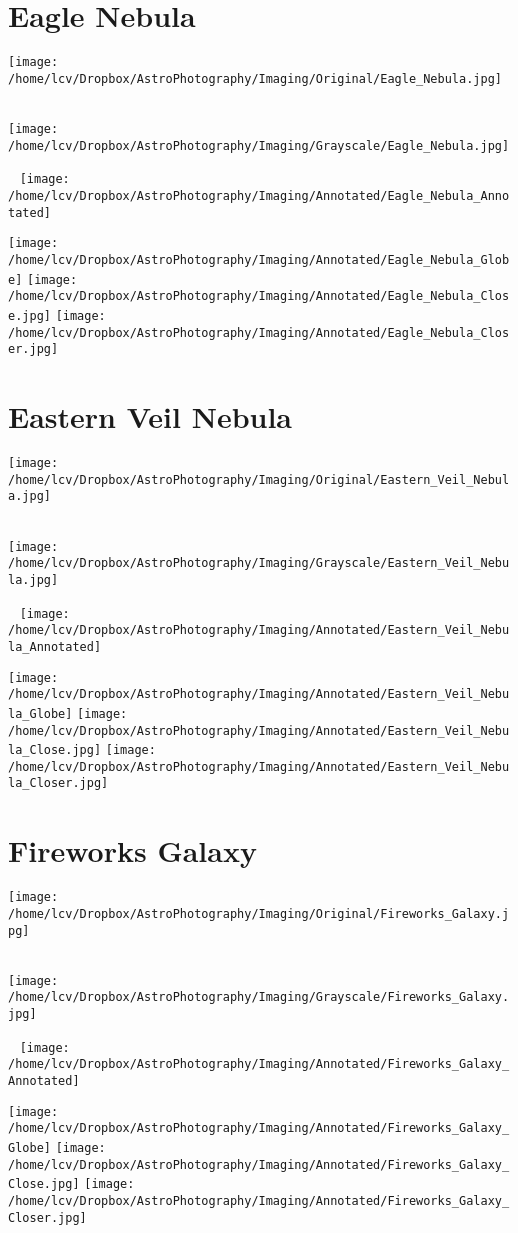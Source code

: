 \section{Eagle Nebula}
\texttt{[image: /home/lcv/Dropbox/AstroPhotography/Imaging/Original/Eagle\_Nebula.jpg]}
{\footnotesize\color{white}

}\ \\
\texttt{[image: /home/lcv/Dropbox/AstroPhotography/Imaging/Grayscale/Eagle\_Nebula.jpg]}
\begin{center}
 \ \newpage
\texttt{[image: /home/lcv/Dropbox/AstroPhotography/Imaging/Annotated/Eagle\_Nebula\_Annotated]}

\texttt{[image: /home/lcv/Dropbox/AstroPhotography/Imaging/Annotated/Eagle\_Nebula\_Globe]}
\texttt{[image: /home/lcv/Dropbox/AstroPhotography/Imaging/Annotated/Eagle\_Nebula\_Close.jpg]}
\texttt{[image: /home/lcv/Dropbox/AstroPhotography/Imaging/Annotated/Eagle\_Nebula\_Closer.jpg]}
\end{center}
\section{Eastern Veil Nebula}
\texttt{[image: /home/lcv/Dropbox/AstroPhotography/Imaging/Original/Eastern\_Veil\_Nebula.jpg]}
{\footnotesize\color{white}

}\ \\
\texttt{[image: /home/lcv/Dropbox/AstroPhotography/Imaging/Grayscale/Eastern\_Veil\_Nebula.jpg]}
\begin{center}
 \ \newpage
\texttt{[image: /home/lcv/Dropbox/AstroPhotography/Imaging/Annotated/Eastern\_Veil\_Nebula\_Annotated]}

\texttt{[image: /home/lcv/Dropbox/AstroPhotography/Imaging/Annotated/Eastern\_Veil\_Nebula\_Globe]}
\texttt{[image: /home/lcv/Dropbox/AstroPhotography/Imaging/Annotated/Eastern\_Veil\_Nebula\_Close.jpg]}
\texttt{[image: /home/lcv/Dropbox/AstroPhotography/Imaging/Annotated/Eastern\_Veil\_Nebula\_Closer.jpg]}
\end{center}
\section{Fireworks Galaxy}
\texttt{[image: /home/lcv/Dropbox/AstroPhotography/Imaging/Original/Fireworks\_Galaxy.jpg]}
{\footnotesize\color{white}

}\ \\
\texttt{[image: /home/lcv/Dropbox/AstroPhotography/Imaging/Grayscale/Fireworks\_Galaxy.jpg]}
\begin{center}
 \ \newpage
\texttt{[image: /home/lcv/Dropbox/AstroPhotography/Imaging/Annotated/Fireworks\_Galaxy\_Annotated]}

\texttt{[image: /home/lcv/Dropbox/AstroPhotography/Imaging/Annotated/Fireworks\_Galaxy\_Globe]}
\texttt{[image: /home/lcv/Dropbox/AstroPhotography/Imaging/Annotated/Fireworks\_Galaxy\_Close.jpg]}
\texttt{[image: /home/lcv/Dropbox/AstroPhotography/Imaging/Annotated/Fireworks\_Galaxy\_Closer.jpg]}
\end{center}
